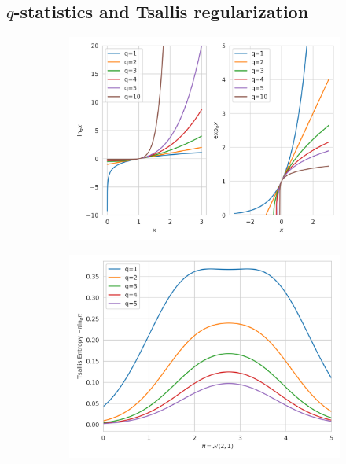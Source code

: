 \documentclass{article}
\begin{document}
\subsection{$q$-statistics and Tsallis regularization}


\begin{figure}
    \centering
    \begin{subfigure}[b]{0.3\textwidth}
        \includegraphics[width=\textwidth]{img/q_stat_illus.png}
    \end{subfigure}
    \begin{subfigure}[b]{0.3\textwidth}
        \includegraphics[width=\textwidth]{img/tsallis_entropy.png}
    \end{subfigure}

\end{figure}
\end{document}
